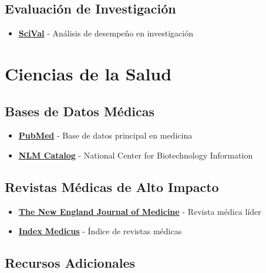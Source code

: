 \documentclass[
  jou,
  floatsintext,
  longtable,
  a4paper,
  nolmodern,
  notxfonts,
  notimes,
  12pt,
  colorlinks=true,linkcolor=blue,citecolor=blue,urlcolor=blue]{apa7}
\providecommand{\tightlist}{%
  \setlength{\itemsep}{0pt}\setlength{\parskip}{0pt}}
\begin{document}
\subsection{Evaluación de
Investigación}\label{evaluaciuxf3n-de-investigaciuxf3n}

\begin{itemize}
\tightlist
\item
  \textbf{\href{https://www.elsevier.com/products/scival}{SciVal}} -
  Análisis de desempeño en investigación
\end{itemize}

\section{Ciencias de la Salud}\label{ciencias-de-la-salud}

\subsection{Bases de Datos Médicas}\label{bases-de-datos-muxe9dicas}

\begin{itemize}
\tightlist
\item
  \textbf{\href{https://pubmed.ncbi.nlm.nih.gov/}{PubMed}} - Base de
  datos principal en medicina
\item
  \textbf{\href{https://www.ncbi.nlm.nih.gov/}{NLM Catalog}} - National
  Center for Biotechnology Information
\end{itemize}

\subsection{Revistas Médicas de Alto
Impacto}\label{revistas-muxe9dicas-de-alto-impacto}

\begin{itemize}
\tightlist
\item
  \textbf{\href{https://www.nejm.org/}{The New England Journal of
  Medicine}} - Revista médica líder
\item
  \textbf{\href{http://www2.bg.ump.edu.pl/czasopisma/medicus.php?lang=eng}{Index
  Medicus}} - Índice de revistas médicas
\end{itemize}

\subsection{Recursos Adicionales}\label{recursos-adicionales}
\end{document}
